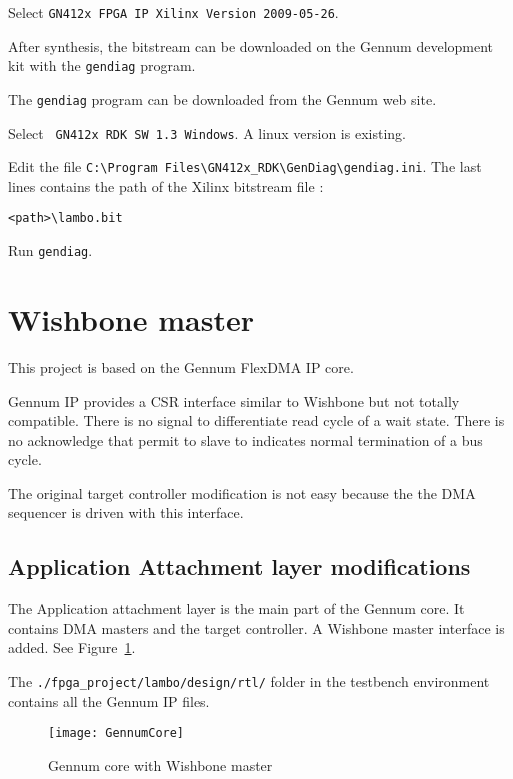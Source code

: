 \documentclass[10pt,a4paper]{cerndoc}
\begin{document}
Select \verb+GN412x FPGA IP Xilinx Version 2009-05-26+.

After synthesis, the bitstream can be downloaded on the Gennum development kit with the \verb+gendiag+ program.

The \verb+gendiag+ program can be downloaded from the Gennum web site. 

Select \verb+ GN412x RDK SW 1.3 Windows+. A linux version is existing.

Edit the file \verb+C:\Program Files\GN412x_RDK\GenDiag\gendiag.ini+. The last lines contains the path of the Xilinx bitstream file :
\begin{lstlisting}
<path>\lambo.bit
\end{lstlisting}

Run \verb+gendiag+.

\section{Wishbone master}

This project is based on the Gennum FlexDMA IP core.

Gennum IP provides a CSR interface similar to Wishbone but not totally compatible. There is no signal to differentiate read cycle of a wait state. There is no acknowledge that permit to slave to indicates normal termination of a bus cycle.

The original target controller modification is not easy because the the DMA sequencer is driven with this interface.

  \subsection{Application Attachment layer modifications}
The Application attachment layer is the main part of the Gennum core. It contains DMA masters and the target controller. A Wishbone master interface is added. See Figure~\ref{fig:GCWWM}.

The \verb+./fpga_project/lambo/design/rtl/+ folder in the testbench environment contains all the Gennum IP files.

\begin{figure}[!ht]
	\centering
		\texttt{[image: GennumCore]}
	\caption{Gennum core with Wishbone master}
	\label{fig:GCWWM}
\end{figure} 
\end{document}
